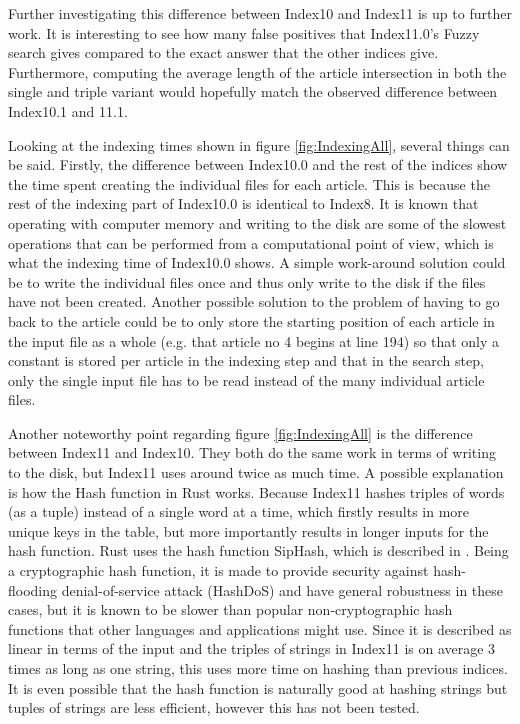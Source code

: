Further investigating this difference between Index10 and Index11 is up to further work. It is interesting to see how many false positives that Index11.0's Fuzzy search gives compared to the exact answer that the other indices give. Furthermore, computing the average length of the article intersection in both the single and triple variant would hopefully match the observed difference between Index10.1 and 11.1. 

Looking at the indexing times shown in figure \ref{fig:IndexingAll}, several things can be said. Firstly, the difference between Index10.0 and the rest of the indices show the time spent creating the individual files for each article. This is because the rest of the indexing part of Index10.0 is identical to Index8. It is known that operating with computer memory and writing to the disk are some of the slowest operations that can be performed from a computational point of view, which is what the indexing time of Index10.0 shows. A simple work-around solution could be to write the individual files once and thus only write to the disk if the files have not been created. Another possible solution to the problem of having to go back to the article could be to only store the starting position of each article in the input file as a whole (e.g. that article no 4 begins at line 194) so that only a constant is stored per article in the indexing step and that in the search step, only the single input file has to be read instead of the many individual article files. 

Another noteworthy point regarding figure \ref{fig:IndexingAll} is the difference between Index11 and Index10. They both do the same work in terms of writing to the disk, but Index11 uses around twice as much time. A possible explanation is how the Hash function in Rust works. Because Index11 hashes triples of words (as a tuple) instead of a single word at a time, which firstly results in more unique keys in the table, but more importantly results in longer inputs for the hash function. Rust uses the hash function SipHash, which is described in \cite{Siphash}. Being a cryptographic hash function, it is made to provide security against hash-flooding denial-of-service attack (HashDoS) and have general robustness in these cases, but it is known to be slower than popular non-cryptographic hash functions that other languages and applications might use. Since it is described as linear in terms of the input\cite{Siphash} and the triples of strings in Index11 is on average 3 times as long as one string, this uses more time on hashing than previous indices. It is even possible that the hash function is naturally good at hashing strings but tuples of strings are less efficient, however this has not been tested. 

